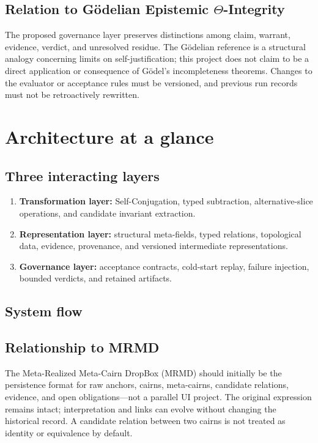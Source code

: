 \documentclass[11pt,oneside]{article}
\begin{document}
\subsection{Relation to Gödelian Epistemic \texorpdfstring{$\Theta$}{Theta}-Integrity}
The proposed governance layer preserves distinctions among claim, warrant, evidence, verdict, and unresolved residue. The Gödelian reference is a structural analogy concerning limits on self-justification; this project does not claim to be a direct application or consequence of Gödel's incompleteness theorems. Changes to the evaluator or acceptance rules must be versioned, and previous run records must not be retroactively rewritten.

\section{Architecture at a glance}
\subsection{Three interacting layers}
\begin{enumerate}
  \item \textbf{Transformation layer:} Self-Conjugation, typed subtraction, alternative-slice operations, and candidate invariant extraction.
  \item \textbf{Representation layer:} structural meta-fields, typed relations, topological data, evidence, provenance, and versioned intermediate representations.
  \item \textbf{Governance layer:} acceptance contracts, cold-start replay, failure injection, bounded verdicts, and retained artifacts.
\end{enumerate}

\subsection{System flow}
\begin{center}
\end{center}

\subsection{Relationship to MRMD}
The Meta-Realized Meta-Cairn DropBox (MRMD) should initially be the persistence format for raw anchors, cairns, meta-cairns, candidate relations, evidence, and open obligations—not a parallel UI project. The original expression remains intact; interpretation and links can evolve without changing the historical record. A candidate relation between two cairns is not treated as identity or equivalence by default.
\end{document}
